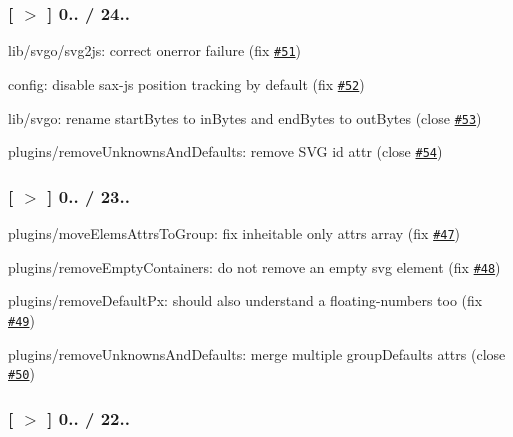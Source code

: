 \subsubsection*{\mbox{[} \href{https://github.com/svg/svgo/tree/v0.1.2}{\tt $>$} \mbox{]} 0.. / 24..}


\begin{DoxyItemize}
\item lib/svgo/svg2js\+: correct \textquotesingle{}onerror\textquotesingle{} failure (fix \href{https://github.com/svg/svgo/issues/51}{\tt \#51})
\item config\+: disable sax-\/js position tracking by default (fix \href{https://github.com/svg/svgo/issues/52}{\tt \#52})
\item lib/svgo\+: rename \textquotesingle{}start\+Bytes\textquotesingle{} to \textquotesingle{}in\+Bytes\textquotesingle{} and \textquotesingle{}end\+Bytes\textquotesingle{} to \textquotesingle{}out\+Bytes\textquotesingle{} (close \href{https://github.com/svg/svgo/issues/53}{\tt \#53})
\item plugins/remove\+Unknowns\+And\+Defaults\+: remove S\+VG id attr (close \href{https://github.com/svg/svgo/issues/54}{\tt \#54})
\end{DoxyItemize}

\subsubsection*{\mbox{[} \href{https://github.com/svg/svgo/tree/v0.1.1}{\tt $>$} \mbox{]} 0.. / 23..}


\begin{DoxyItemize}
\item plugins/move\+Elems\+Attrs\+To\+Group\+: fix inheitable only attrs array (fix \href{https://github.com/svg/svgo/issues/47}{\tt \#47})
\item plugins/remove\+Empty\+Containers\+: do not remove an empty \textquotesingle{}svg\textquotesingle{} element (fix \href{https://github.com/svg/svgo/issues/48}{\tt \#48})
\item plugins/remove\+Default\+Px\+: should also understand a floating-\/numbers too (fix \href{https://github.com/svg/svgo/issues/49}{\tt \#49})
\item plugins/remove\+Unknowns\+And\+Defaults\+: merge multiple group\+Defaults attrs (close \href{https://github.com/svg/svgo/issues/50}{\tt \#50})
\end{DoxyItemize}

\subsubsection*{\mbox{[} \href{https://github.com/svg/svgo/tree/v0.1.0}{\tt $>$} \mbox{]} 0.. / 22..}



